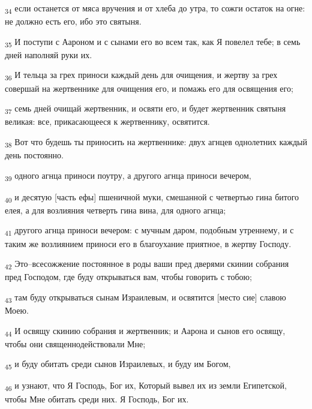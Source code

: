 \begin{tcolorbox}
\textsubscript{34} если останется от мяса вручения и от хлеба до утра, то сожги остаток на огне: не должно есть его, ибо это святыня.
\end{tcolorbox}
\begin{tcolorbox}
\textsubscript{35} И поступи с Аароном и с сынами его во всем так, как Я повелел тебе; в семь дней наполняй руки их.
\end{tcolorbox}
\begin{tcolorbox}
\textsubscript{36} И тельца за грех приноси каждый день для очищения, и жертву за грех совершай на жертвеннике для очищения его, и помажь его для освящения его;
\end{tcolorbox}
\begin{tcolorbox}
\textsubscript{37} семь дней очищай жертвенник, и освяти его, и будет жертвенник святыня великая: все, прикасающееся к жертвеннику, освятится.
\end{tcolorbox}
\begin{tcolorbox}
\textsubscript{38} Вот что будешь ты приносить на жертвеннике: двух агнцев однолетних каждый день постоянно.
\end{tcolorbox}
\begin{tcolorbox}
\textsubscript{39} одного агнца приноси поутру, а другого агнца приноси вечером,
\end{tcolorbox}
\begin{tcolorbox}
\textsubscript{40} и десятую [часть ефы] пшеничной муки, смешанной с четвертью гина битого елея, а для возлияния четверть гина вина, для одного агнца;
\end{tcolorbox}
\begin{tcolorbox}
\textsubscript{41} другого агнца приноси вечером: с мучным даром, подобным утреннему, и с таким же возлиянием приноси его в благоухание приятное, в жертву Господу.
\end{tcolorbox}
\begin{tcolorbox}
\textsubscript{42} Это--всесожжение постоянное в роды ваши пред дверями скинии собрания пред Господом, где буду открываться вам, чтобы говорить с тобою;
\end{tcolorbox}
\begin{tcolorbox}
\textsubscript{43} там буду открываться сынам Израилевым, и освятится [место сие] славою Моею.
\end{tcolorbox}
\begin{tcolorbox}
\textsubscript{44} И освящу скинию собрания и жертвенник; и Аарона и сынов его освящу, чтобы они священнодействовали Мне;
\end{tcolorbox}
\begin{tcolorbox}
\textsubscript{45} и буду обитать среди сынов Израилевых, и буду им Богом,
\end{tcolorbox}
\begin{tcolorbox}
\textsubscript{46} и узнают, что Я Господь, Бог их, Который вывел их из земли Египетской, чтобы Мне обитать среди них. Я Господь, Бог их.
\end{tcolorbox}
